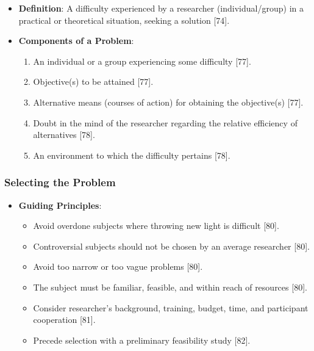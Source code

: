 \documentclass[
]{article}
\providecommand{\tightlist}{%
  \setlength{\itemsep}{0pt}\setlength{\parskip}{0pt}}
\begin{document}
\begin{itemize}
\tightlist
\item
  \textbf{Definition}: A difficulty experienced by a researcher
  (individual/group) in a practical or theoretical situation, seeking a
  solution {[}74{]}.
\item
  \textbf{Components of a Problem}:

  \begin{enumerate}
  \def\labelenumi{\arabic{enumi}.}
  \tightlist
  \item
    An individual or a group experiencing some difficulty {[}77{]}.
  \item
    Objective(s) to be attained {[}77{]}.
  \item
    Alternative means (courses of action) for obtaining the objective(s)
    {[}77{]}.
  \item
    Doubt in the mind of the researcher regarding the relative
    efficiency of alternatives {[}78{]}.
  \item
    An environment to which the difficulty pertains {[}78{]}.
  \end{enumerate}
\end{itemize}

\subsubsection{Selecting the Problem}\label{selecting-the-problem}

\begin{itemize}
\tightlist
\item
  \textbf{Guiding Principles}:

  \begin{itemize}
  \tightlist
  \item
    Avoid overdone subjects where throwing new light is difficult
    {[}80{]}.
  \item
    Controversial subjects should not be chosen by an average researcher
    {[}80{]}.
  \item
    Avoid too narrow or too vague problems {[}80{]}.
  \item
    The subject must be familiar, feasible, and within reach of
    resources {[}80{]}.
  \item
    Consider researcher's background, training, budget, time, and
    participant cooperation {[}81{]}.
  \item
    Precede selection with a preliminary feasibility study {[}82{]}.
  \end{itemize}
\end{itemize}
\end{document}
